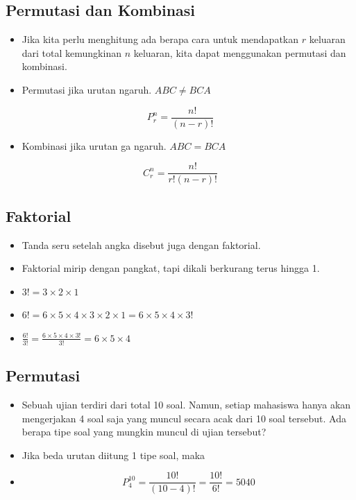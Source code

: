 \documentclass[
  letterpaper,
  DIV=11,
  numbers=noendperiod]{scrartcl}
\providecommand{\tightlist}{%
  \setlength{\itemsep}{0pt}\setlength{\parskip}{0pt}}\usepackage{longtable,booktabs,array}
\begin{document}
\subsection{Permutasi dan Kombinasi}\label{permutasi-dan-kombinasi}

\begin{itemize}
\item
  Jika kita perlu menghitung ada berapa cara untuk mendapatkan \(r\)
  keluaran dari total kemungkinan \(n\) keluaran, kita dapat menggunakan
  permutasi dan kombinasi.
\item
  Permutasi jika urutan ngaruh. \(ABC \neq BCA\)
\end{itemize}

\[
P^n_r=\frac{n!}{(n-r)!}
\]

\begin{itemize}
\tightlist
\item
  Kombinasi jika urutan ga ngaruh. \(ABC=BCA\)
\end{itemize}

\[
C^n_r=\frac{n!}{r!(n-r)!}
\]

\subsection{Faktorial}\label{faktorial}

\begin{itemize}
\item
  Tanda seru setelah angka disebut juga dengan faktorial.
\item
  Faktorial mirip dengan pangkat, tapi dikali berkurang terus hingga 1.
\item
  \(3!=3\times 2\times 1\)
\item
  \(6!=6\times 5\times 4 \times 3 \times 2 \times 1=6 \times 5 \times 4 \times 3!\)
\item
  \(\frac{6!}{3!}=\frac{6 \times 5 \times 4 \times 3!}{3!}=6 \times 5 \times 4\)
\end{itemize}

\subsection{Permutasi}\label{permutasi}

\begin{itemize}
\item
  Sebuah ujian terdiri dari total 10 soal. Namun, setiap mahasiswa hanya
  akan mengerjakan 4 soal saja yang muncul secara acak dari 10 soal
  tersebut. Ada berapa tipe soal yang mungkin muncul di ujian tersebut?
\item
  Jika beda urutan diitung 1 tipe soal, maka
\item
  \[P^{10}_4=\frac{10!}{(10-4)!}=\frac{10!}{6!}=5040\]
\end{itemize}
\end{document}
